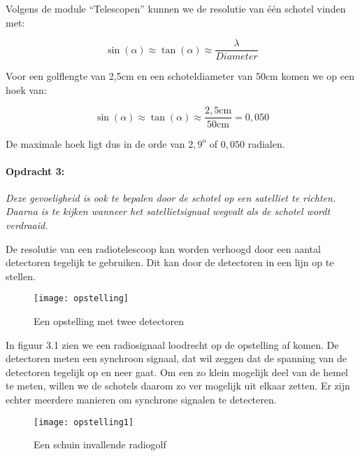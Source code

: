 Volgens de module ``Telescopen'' kunnen we de resolutie van één
schotel vinden met:

\begin{equation}
\sin(\alpha)\approx \tan(\alpha)\approx\frac{\lambda}{Diameter}
\end{equation}


Voor een golflengte van 2,5cm en een schoteldiameter van 50cm komen
we op een hoek van:

\begin{equation}
\sin(\alpha)\approx \tan(\alpha)\approx\frac{\mathrm{2,5cm}}{50\mathrm{cm}}=0,050
\end{equation}


De maximale hoek ligt dus in de orde van $2,9^{\mathrm{o}}$ of $0,050$
radialen.


\paragraph*{Opdracht 3:}

\emph{Deze gevoeligheid is ook te bepalen door de schotel op een satelliet
te richten. Daarna is te kijken wanneer het satellietsignaal wegvalt
als de schotel wordt verdraaid.}

De resolutie van een radiotelescoop kan worden verhoogd door een aantal
detectoren tegelijk te gebruiken. Dit kan door de detectoren in een
lijn op te stellen.

\begin{figure}[H]
\noindent \begin{centering}
\texttt{[image: opstelling]}
\par\end{centering}

\caption{Een opstelling met twee detectoren}
\end{figure}


In figuur 3.1 zien we een radiosignaal loodrecht op de opstelling
af komen. De detectoren meten een synchroon signaal, dat wil zeggen
dat de spanning van de detectoren tegelijk op en neer gaat. Om een
zo klein mogelijk deel van de hemel te meten, willen we de schotels
daarom zo ver mogelijk uit elkaar zetten. Er zijn echter meerdere
manieren om synchrone signalen te detecteren.

\begin{figure}[H]
\noindent \begin{centering}
\texttt{[image: opstelling1]}
\par\end{centering}

\caption{Een schuin invallende radiogolf}
\end{figure}


